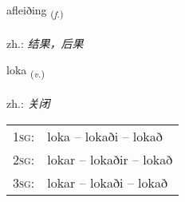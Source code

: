 \documentclass[frontgrid, backgrid]{flacards}\usepackage[]{graphicx}\usepackage[]{xcolor}
\begin{document}
\renewcommand{\flhead}{\vskip5pt \fboxsep=0pt {\small\bfseries\footnotesize Nafnorð | 名词}}
\renewcommand{\fcfoot}{\vskip5pt \fboxsep=0pt \hspace{2pt}{\small\bfseries\footnotesize 1K}}

\renewcommand{\blhead}{\vskip5pt {\small\bfseries\footnotesize Nafnorð | 名词 }}
\renewcommand{\bcfoot}{\vskip5pt \hspace{2pt}{\small\bfseries\footnotesize 1K}}


{afleiðing \small{\textsubscript{(\textit{f.})}} \\[1ex] %
\textphonetic{[avleiðiŋk]} \\
zh.: \emph{结果，后果} \\  [2ex]
\renewcommand*{\arraystretch}{0.8}
}

\renewcommand{\flhead}{\vskip5pt \fboxsep=0pt {\small\bfseries\footnotesize Sagnorð | 动词}}
\renewcommand{\fcfoot}{\vskip5pt \fboxsep=0pt \hspace{2pt}{\small\bfseries\footnotesize 1K}}

\renewcommand{\blhead}{\vskip5pt {\small\bfseries\footnotesize Sagnorð | 动词 }}
\renewcommand{\bcfoot}{\vskip5pt \hspace{2pt}{\small\bfseries\footnotesize 1K}}


{loka \small{\textsubscript{(\textit{v.})}} \\[1ex] %
\textphonetic{[lɔːka]} \\
zh.: \emph{关闭} \\  [2ex]
\renewcommand*{\arraystretch}{0.8}
\begin{tabular}{p{1cm}l}
\textsc{1sg}: & loka -- lokaði -- lokað \\ 
\textsc{2sg}: & lokar -- lokaðir -- lokað \\ 
\textsc{3sg}: & lokar -- lokaði -- lokað \\ 
\end{tabular}
}
\end{document}
